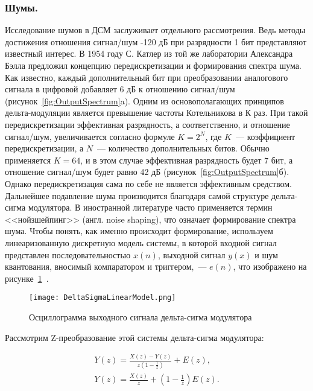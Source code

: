 \subsubsection{Шумы. }
Исследование шумов в ДСМ заслуживает отдельного рассмотрения. Ведь методы достижения отношения сигнал/шум -120 дБ при разрядности 1 бит представляют известный интерес. В 1954 году С. Катлер из той же лаборатории Александра Бэлла предложил концепцию передискретизации и формирования спектра шума. Как известно, каждый дополнительный бит при преобразовании аналогового сигнала в цифровой добавляет 6 дБ к отношению сигнал/шум (рисунок~\ref{fig:OutputSpectrum}a). Одним из основополагающих принципов дельта-модуляции является превышение частоты Котельникова в К раз. При такой передискретизации эффективная разрядность, а соответственно, и отношение сигнал/шум, увеличивается согласно формуле $K=2^N$, где $K$~--- коэффициент передискретизации, а $N$~--- количество дополнительных битов. Обычно применяется $K=64$, и в этом случае эффективная разрядность будет 7 бит, а отношение сигнал/шум будет равно 42 дБ (рисунок~\ref{fig:OutputSpectrum}б). Однако передискретизация сама по себе не является эффективным средством. Дальнейшее подавление шума производится благодаря самой структуре дельта-сигма модулятора. В иностранной литературе часто применяется термин <<нойзшейпинг>> (англ. \foreignlanguage{english}{noise shaping}), что означает формирование спектра шума. Чтобы понять, как именно происходит формирование, используем линеаризованную дискретную модель системы, в которой входной сигнал представлен последовательностью $x(n)$, выходной сигнал $y(x)$ и шум квантования, вносимый компаратором и триггером,~--- $e(n)$, что изображено на рисунке~\ref{fig:DeltaSigmaLinearModel}~\cite{KitE_DeltaSigma}.

\begin{figure}[ht]
	\centering
	\texttt{[image: DeltaSigmaLinearModel.png]}  
	\caption{Осциллограмма выходного сигнала дельта-сигма модулятора}
	\label{fig:DeltaSigmaLinearModel}
\end{figure}

Рассмотрим Z-преобразование этой системы дельта-сигма модулятора:

\begin{gather}
	Y(z)=\frac{X(z)-Y(z)}{z\left(1-\frac{1}{z}\right)}+E(z), \\
	Y(z)=\frac{X(z)}{z}+\left(1-\frac{1}{z}\right)E(z).
\end{gather}

